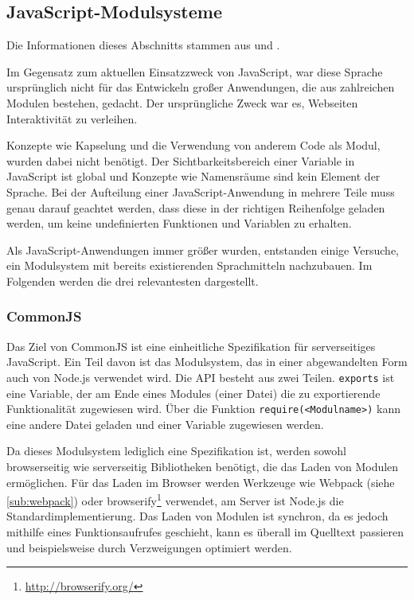 \subsection{JavaScript-Modulsysteme}
\label{sub:js-modulesystems}
Die Informationen dieses Abschnitts stammen aus \autocite{Osmani.js-modules:online} und \autocite{Peyrott.js-modules:online}.

Im Gegensatz zum aktuellen Einsatzzweck von JavaScript, war diese Sprache ursprünglich nicht für das Entwickeln großer Anwendungen, die aus zahlreichen Modulen bestehen, gedacht.
Der ursprüngliche Zweck war es, Webseiten Interaktivität zu verleihen.

Konzepte wie Kapselung und die Verwendung von anderem Code als Modul, wurden dabei nicht benötigt.
Der Sichtbarkeitsbereich einer Variable in JavaScript ist global und Konzepte wie Namensräume sind kein Element der Sprache.
Bei der Aufteilung einer JavaScript-Anwendung in mehrere Teile muss genau darauf geachtet werden, dass diese in der richtigen Reihenfolge geladen werden, um keine undefinierten Funktionen und Variablen zu erhalten.

Als JavaScript-Anwendungen immer größer wurden, entstanden einige Versuche, ein Modulsystem mit bereits existierenden Sprachmitteln nachzubauen. Im Folgenden werden die drei relevantesten dargestellt.

\subsubsection{CommonJS}
\label{sub:commonjs}
Das Ziel von CommonJS ist eine einheitliche Spezifikation für serverseitiges JavaScript.
Ein Teil davon ist das Modulsystem, das in einer abgewandelten Form auch von Node.js verwendet wird.
Die API besteht aus zwei Teilen.
\verb|exports| ist eine Variable, der am Ende eines Modules (einer Datei) die zu exportierende Funktionalität zugewiesen wird.
Über die Funktion \verb|require(<Modulname>)| kann eine andere Datei geladen und einer Variable zugewiesen werden.

Da dieses Modulsystem lediglich eine Spezifikation ist, werden sowohl browserseitig wie serverseitig Bibliotheken benötigt, die das Laden von Modulen ermöglichen.
Für das Laden im Browser werden Werkzeuge wie Webpack (siehe \cref{sub:webpack}) oder browserify\footnote{\url{http://browserify.org/}} verwendet, am Server ist Node.js die Standardimplementierung.
Das Laden von Modulen ist synchron, da es jedoch mithilfe eines Funktionsaufrufes geschieht, kann es überall im Quelltext passieren und beispielsweise durch Verzweigungen optimiert werden. 

